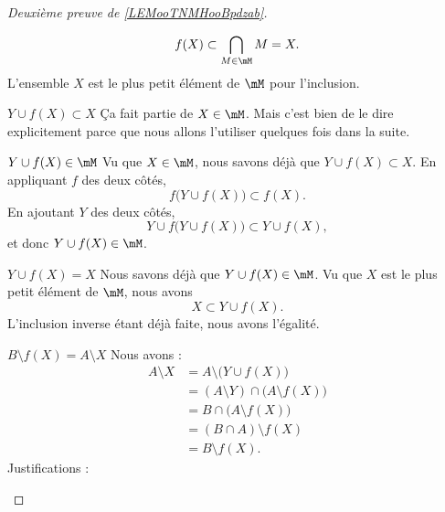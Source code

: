 \begin{proof}[Deuxième preuve de \ref{LEMooTNMHooBpdzab}\cite{BIBooZFPUooIiywbk}]
\begin{subproof}
\begin{equation}
                f(X)\subset \bigcap_{M\in\mM}M=X.
            \end{equation}
            L'ensemble \( X\) est le plus petit élément de \( \mM\) pour l'inclusion.
        \item[\( Y\cup f(X)\subset X\)]
            Ça fait partie de \( X\in \mM\). Mais c'est bien de le dire explicitement parce que nous allons l'utiliser quelques fois dans la suite.
        \item[\( Y\cup f(X)\in\mM\)]
            Vu que \( X\in\mM\), nous savons déjà que \( Y\cup f(X)\subset X\). En appliquant \( f\) des deux côtés,
            \begin{equation}
                f\big( Y\cup f(X) \big)\subset f(X).
            \end{equation}
            En ajoutant \( Y\) des deux côtés,
            \begin{equation}
                Y\cup f\big( Y\cup f(X) \big)\subset Y\cup f(X),
            \end{equation}
            et donc \( Y\cup f(X)\in \mM\).
        \item[\( Y\cup f(X)=X\)]
            Nous savons déjà que \( Y\cup f(X)\in \mM\). Vu que \( X\) est le plus petit élément de \( \mM\), nous avons
            \begin{equation}
                X\subset Y\cup f(X).
            \end{equation}
            L'inclusion inverse étant déjà faite, nous avons l'égalité.
        \item[\( B\setminus f(X)=A\setminus X\)]
            Nous avons :
            \begin{subequations}
                \begin{align}
                    A\setminus X&=A\setminus\big( Y\cup f(X) \big)\\
                    &=(A\setminus Y)\cap \big( A\setminus f(X) \big)     \label{SUBEQooBVZCooAEUJtT}\\
                    &=B\cap \big( A\setminus f(X) \big)         \label{SUBEQooUATVooPErmHT}\\
                    &=(B\cap A)\setminus f(X)       \label{SUBEQooKWVWooOMLzrv}     \\
                    &=B\setminus f(X).      \label{SUBEQooQTTSooIFSFKo}
                \end{align}
            \end{subequations}
            Justifications :
            \begin{itemize}

\end{itemize}
\end{subproof}
\end{proof}
